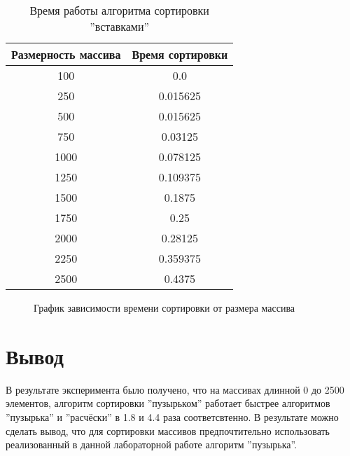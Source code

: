 \begin{table}[h!]
  \begin{center}
    \captionsetup{justification=raggedright}
    \caption{Время работы алгоритма сортировки ''вставками''}
    \label{tab:workcost_classic}
    \begin{tabular}{c|c}
      \textbf{Размерность массива} & \textbf{Время сортировки}\\
      \hline
	100 & 0.0\\
	250 & 0.015625\\
	500 & 0.015625\\
	750 & 0.03125\\
	1000 & 0.078125\\
	1250 & 0.109375\\
	1500 & 0.1875\\
	1750 & 0.25\\
	2000 & 0.28125\\
	2250 & 0.359375\\
	2500 & 0.4375\\
    \end{tabular}
  \end{center}
\end{table}

\newpage

\begin{figure}[ph!]
	\caption{График зависимости времени сортировки от размера массива}
\end{figure}

\section{Вывод}
В результате эксперимента было получено, что на массивах длинной 0 до 2500 элементов, алгоритм сортировки ''пузырьком'' работает быстрее алгоритмов ''пузырька'' и ''расчёски'' в 1.8 и 4.4 раза соответсвтенно. В результате можно сделать вывод, что для сортировки массивов предпочтительно использовать реализованный в данной лабораторной работе алгоритм ''пузырька''.